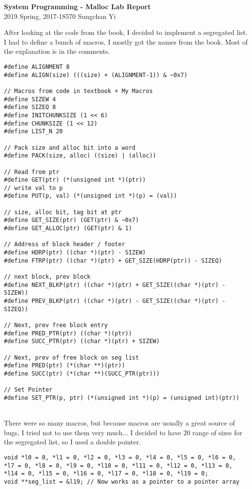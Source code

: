 \documentclass[12pt]{report}
\begin{document}
\begin{center}
\textbf{\Large System Programming - Malloc Lab Report}\\
\large 2019 Spring, 2017-18570 Sungchan Yi
\end{center}
After looking at the code from the book, I decided to implement a segregated list. I had to define a bunch of macros, I mostly got the names from the book. Most of the explanation is in the comments.
\begin{lstlisting}[style=Cstyle]
#define ALIGNMENT 8
#define ALIGN(size) (((size) + (ALIGNMENT-1)) & ~0x7)

// Macros from code in textbook + My Macros
#define SIZEW 4
#define SIZEQ 8
#define INITCHUNKSIZE (1 << 6)
#define CHUNKSIZE (1 << 12)
#define LIST_N 20

// Pack size and alloc bit into a word
#define PACK(size, alloc) ((size) | (alloc))

// Read from ptr
#define GET(ptr) (*(unsigned int *)(ptr))
// write val to p
#define PUT(p, val) (*(unsigned int *)(p) = (val))

// size, alloc bit, tag bit at ptr
#define GET_SIZE(ptr) (GET(ptr) & ~0x7)
#define GET_ALLOC(ptr) (GET(ptr) & 1)

// Address of block header / footer
#define HDRP(ptr) ((char *)(ptr) - SIZEW)
#define FTRP(ptr) ((char *)(ptr) + GET_SIZE(HDRP(ptr)) - SIZEQ)

// next block, prev block
#define NEXT_BLKP(ptr) ((char *)(ptr) + GET_SIZE((char *)(ptr) - SIZEW))
#define PREV_BLKP(ptr) ((char *)(ptr) - GET_SIZE((char *)(ptr) - SIZEQ))

// Next, prev free block entry
#define PRED_PTR(ptr) ((char *)(ptr))
#define SUCC_PTR(ptr) ((char *)(ptr) + SIZEW)

// Next, prev of free block on seg list
#define PRED(ptr) (*(char **)(ptr))
#define SUCC(ptr) (*(char **)(SUCC_PTR(ptr)))

// Set Pointer
#define SET_PTR(p, ptr) (*(unsigned int *)(p) = (unsigned int)(ptr))
\end{lstlisting}~\\
There were so many macros, but because macros are usually a great source of bugs, I tried not to use them very much... I decided to have 20 range of sizes for the segregated list, so I used a double pointer.
\begin{lstlisting}[style=Cstyle]
void *l0 = 0, *l1 = 0, *l2 = 0, *l3 = 0, *l4 = 0, *l5 = 0, *l6 = 0, *l7 = 0, *l8 = 0, *l9 = 0, *l10 = 0, *l11 = 0, *l12 = 0, *l13 = 0, *l14 = 0, *l15 = 0, *l16 = 0, *l17 = 0, *l18 = 0, *l19 = 0;
void **seg_list = &l19; // Now works as a pointer to a pointer array
\end{lstlisting}~\\
\end{document}
